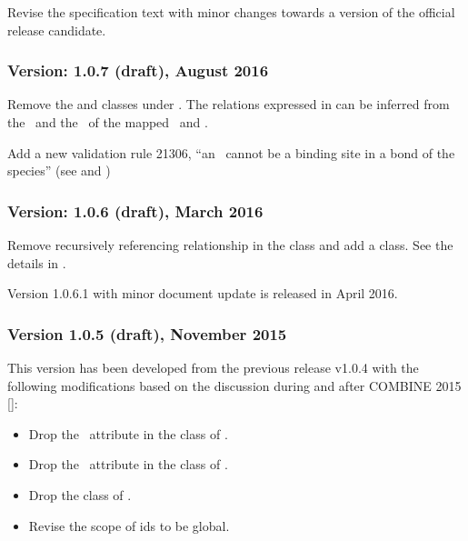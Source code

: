 Revise the specification text with minor changes towards a version of the official release candidate. 


\subsubsection{Version: 1.0.7 (draft), August 2016}
\label{def:v1_0_7}

Remove the  and  classes under \SpeciesTypeComponentMapInProduct. The relations expressed in  can be inferred from the \speciesTypeComponentMapInProduct\ and the \species\ of the mapped \reactant\ and \product.

Add a new validation rule 21306, ``an \outwardBindingSite\ cannot be a binding site in a bond of the species'' (see  and )

\subsubsection{Version: 1.0.6 (draft), March 2016}
\label{def:v1_0_6}

Remove recursively referencing relationship in the \ListOfSpeciesFeatures class and add a \SubListOfSpeciesFeatures class. See the details in \ExSpecies.

Version 1.0.6.1 with minor document update is released in April 2016.

\subsubsection{Version 1.0.5 (draft), November 2015}
\label{def:v1_0_5}

This version has been developed from the previous release v1.0.4 with the following modifications based on the discussion during and after COMBINE 2015 [\cite{ref:combine2015}]: 

\begin{itemize}
 \item Drop the \occurAtt\ attribute in the class of \SpeciesTypeInstance.
 \item Drop the \occurAtt\ attribute in the class of \SpeciesTypeComponentIndex.
 \item Drop the class of .
 \item Revise the scope of \PossibleSpeciesFeatureValue ids to be global.
\end{itemize}

